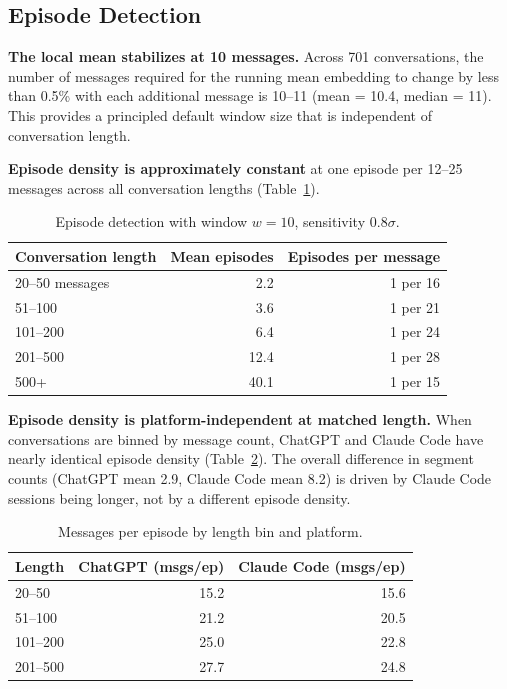 \documentclass[11pt]{article}
\begin{document}
\subsection{Episode Detection}
\label{sec:stabilization}

\textbf{The local mean stabilizes at 10 messages.} Across 701 conversations, the number of messages required for the running mean embedding to change by less than 0.5\% with each additional message is 10--11 (mean = 10.4, median = 11). This provides a principled default window size that is independent of conversation length.

\textbf{Episode density is approximately constant} at one episode per 12--25 messages across all conversation lengths (Table~\ref{tab:episodes}).

\begin{table}[h]
\centering
\caption{Episode detection with window $w = 10$, sensitivity $0.8\sigma$.}
\label{tab:episodes}
\begin{tabular}{lrr}
\toprule
Conversation length & Mean episodes & Episodes per message \\
\midrule
20--50 messages & 2.2 & 1 per 16 \\
51--100 & 3.6 & 1 per 21 \\
101--200 & 6.4 & 1 per 24 \\
201--500 & 12.4 & 1 per 28 \\
500+ & 40.1 & 1 per 15 \\
\bottomrule
\end{tabular}
\end{table}

\textbf{Episode density is platform-independent at matched length.} When conversations are binned by message count, ChatGPT and Claude Code have nearly identical episode density (Table~\ref{tab:platform_density}). The overall difference in segment counts (ChatGPT mean 2.9, Claude Code mean 8.2) is driven by Claude Code sessions being longer, not by a different episode density.

\begin{table}[h]
\centering
\caption{Messages per episode by length bin and platform.}
\label{tab:platform_density}
\begin{tabular}{lrr}
\toprule
Length & ChatGPT (msgs/ep) & Claude Code (msgs/ep) \\
\midrule
20--50 & 15.2 & 15.6 \\
51--100 & 21.2 & 20.5 \\
101--200 & 25.0 & 22.8 \\
201--500 & 27.7 & 24.8 \\
\bottomrule
\end{tabular}
\end{table}
\end{document}
